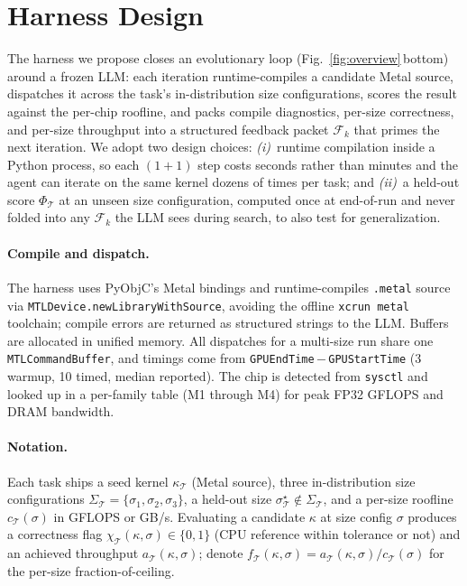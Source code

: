 \documentclass{article}
\theoremstyle{plain}
\theoremstyle{definition}
\theoremstyle{remark}
\begin{document}
\section{Harness Design}
\label{sec:harness}

The harness we propose closes an evolutionary loop (Fig.~\ref{fig:overview}\,bottom) around a frozen LLM: each
  iteration runtime-compiles a candidate Metal source, dispatches it
  across the task's in-distribution size configurations, scores the result against the
  per-chip roofline, and packs compile diagnostics, per-size
  correctness, and per-size throughput into a structured feedback
  packet $\mathcal{F}_k$ that primes the next iteration. We adopt two design choices: \emph{(i)}~runtime compilation inside
  a Python process, so each $(1{+}1)$ step costs seconds rather than
  minutes and the agent can iterate on the same kernel dozens of times
  per task; and \emph{(ii)}~a held-out score $\Phi_{\mathcal{T}}$ at an unseen size configuration, computed once at end-of-run and never folded into
  any $\mathcal{F}_k$ the LLM sees during search, to also test for generalization. %

\paragraph{Compile and dispatch.} The harness uses PyObjC's Metal bindings
and runtime-compiles \texttt{.metal} source via
\texttt{MTLDevice.newLibraryWithSource}, avoiding the offline
\texttt{xcrun metal} toolchain; compile errors are returned as structured
strings to the LLM. Buffers are allocated in unified memory. All dispatches for a
multi-size run share one \texttt{MTLCommandBuffer}, and timings come from
\texttt{GPUEndTime}\,$-$\,\texttt{GPUStartTime} (3 warmup, 10 timed,
median reported). The chip is detected from \texttt{sysctl} and looked up
in a per-family table (M1 through M4) for peak FP32 GFLOPS and DRAM
bandwidth.

\paragraph{Notation.} Each task ships a seed kernel
$\kappa_{\mathcal{T}}$ (Metal source), three in-distribution size
configurations $\Sigma_{\mathcal{T}}{=}\{\sigma_1,\sigma_2,\sigma_3\}$, a held-out
size $\sigma^{\star}_{\mathcal{T}}{\notin}\Sigma_{\mathcal{T}}$, and a
per-size roofline $c_{\mathcal{T}}(\sigma)$ in GFLOPS or GB/s. Evaluating a
candidate $\kappa$ at size config $\sigma$ produces a correctness flag
$\chi_{\mathcal{T}}(\kappa,\sigma){\in}\{0,1\}$ (CPU reference within
tolerance or not) and an achieved throughput
$a_{\mathcal{T}}(\kappa,\sigma)$; denote
$f_{\mathcal{T}}(\kappa,\sigma){=}a_{\mathcal{T}}(\kappa,\sigma)/c_{\mathcal{T}}(\sigma)$
for the per-size fraction-of-ceiling.
\end{document}
